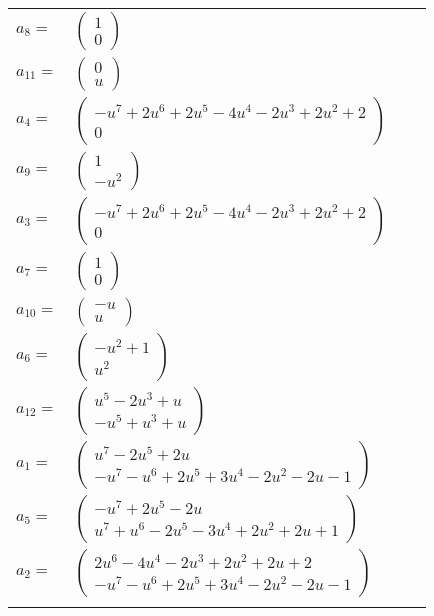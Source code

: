 \documentclass[1p]{elsarticle_modified}
\theoremstyle{definition}
\begin{document}
\begin{tabular}{m{7pt} m{180pt} m{7pt} m{180pt} }
\flushright $a_{8}=$&$\begin{pmatrix}1\\0\end{pmatrix}$ \\
\flushright $a_{11}=$&$\begin{pmatrix}0\\u\end{pmatrix}$ \\
\flushright $a_{4}=$&$\begin{pmatrix}- u^7+2 u^6+2 u^5-4 u^4-2 u^3+2 u^2+2\\0\end{pmatrix}$ \\
\flushright $a_{9}=$&$\begin{pmatrix}1\\- u^2\end{pmatrix}$ \\
\flushright $a_{3}=$&$\begin{pmatrix}- u^7+2 u^6+2 u^5-4 u^4-2 u^3+2 u^2+2\\0\end{pmatrix}$ \\
\flushright $a_{7}=$&$\begin{pmatrix}1\\0\end{pmatrix}$ \\
\flushright $a_{10}=$&$\begin{pmatrix}- u\\u\end{pmatrix}$ \\
\flushright $a_{6}=$&$\begin{pmatrix}- u^2+1\\u^2\end{pmatrix}$ \\
\flushright $a_{12}=$&$\begin{pmatrix}u^5-2 u^3+u\\- u^5+u^3+u\end{pmatrix}$ \\
\flushright $a_{1}=$&$\begin{pmatrix}u^7-2 u^5+2 u\\- u^7- u^6+2 u^5+3 u^4-2 u^2-2 u-1\end{pmatrix}$ \\
\flushright $a_{5}=$&$\begin{pmatrix}- u^7+2 u^5-2 u\\u^7+u^6-2 u^5-3 u^4+2 u^2+2 u+1\end{pmatrix}$ \\
\flushright $a_{2}=$&$\begin{pmatrix}2 u^6-4 u^4-2 u^3+2 u^2+2 u+2\\- u^7- u^6+2 u^5+3 u^4-2 u^2-2 u-1\end{pmatrix}$\\&\end{tabular}
\end{document}
